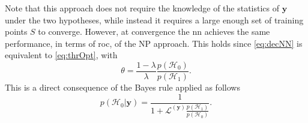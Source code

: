 \documentclass[conference,draftcls,onecolumn]{IEEEtran}
\begin{document}
Note that this approach does not require the knowledge of the statistics of $\bm{y}$ under the two hypotheses, while instead it requires a large enough set of training points $S$ to converge.
However, at convergence the \ac{nn} achieves the same performance, in terms of \ac{roc}, of the NP approach. This holds since \eqref{eq:decNN} is equivalent to \eqref{eq:thrOpt}, with
\begin{equation}
	\theta = \frac{1-\lambda}{\lambda} \frac{p(\mathcal{H}_0)}{p(\mathcal{H}_1)}.	
\end{equation}  
This is a direct consequence of the Bayes rule applied as follows 
\begin{equation}
	p(\mathcal{H}_0| \bm y) = \frac{1}{1+\mathcal{L}^{(\bm y)} \frac{p(\mathcal{H}_1)}{p(\mathcal{H}_0)}}.	
\end{equation}




\end{document}
